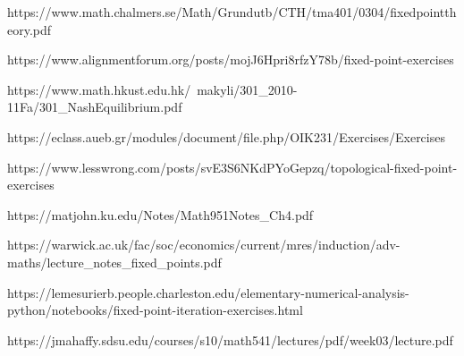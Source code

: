 https://www.math.chalmers.se/Math/Grundutb/CTH/tma401/0304/fixedpointtheory.pdf

https://www.alignmentforum.org/posts/mojJ6Hpri8rfzY78b/fixed-point-exercises

https://www.math.hkust.edu.hk/~makyli/301_2010-11Fa/301_NashEquilibrium.pdf

https://eclass.aueb.gr/modules/document/file.php/OIK231/Exercises/Exercises%

https://www.lesswrong.com/posts/svE3S6NKdPYoGepzq/topological-fixed-point-exercises

https://matjohn.ku.edu/Notes/Math951Notes_Ch4.pdf

https://warwick.ac.uk/fac/soc/economics/current/mres/induction/adv-maths/lecture_notes_fixed_points.pdf

https://lemesurierb.people.charleston.edu/elementary-numerical-analysis-python/notebooks/fixed-point-iteration-exercises.html

https://jmahaffy.sdsu.edu/courses/s10/math541/lectures/pdf/week03/lecture.pdf
